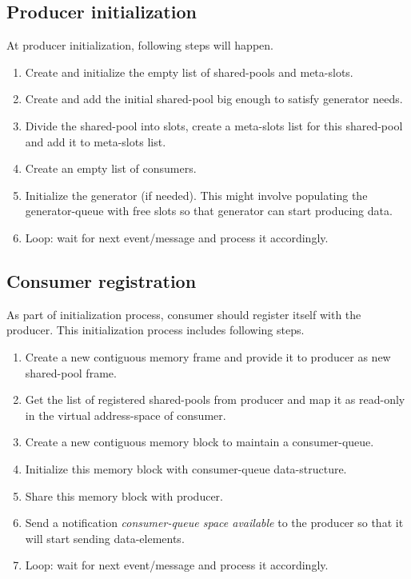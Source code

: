 \documentclass[a4paper,twoside]{report} %
\begin{document}
\subsection{Producer initialization}
At producer initialization, following steps will happen.
\begin{enumerate} 
  \item Create and initialize the empty list of shared-pools and meta-slots.
  \item Create and add the initial shared-pool big enough to satisfy 
  generator needs.  
  \item Divide the shared-pool into slots, create a meta-slots list
  for this shared-pool and add it to meta-slots list.
  \item Create an empty list of consumers.
  \item Initialize the generator (if needed).  This might involve
  populating the generator-queue with free slots so that generator can
  start producing data.
  \item Loop: wait for next event/message and process it accordingly.
\end{enumerate} 



\subsection{Consumer registration}
As part of initialization process, consumer should register itself
with the producer.  This initialization process includes following 
steps.
\begin{enumerate}
  \item Create a new contiguous memory frame and provide it to
  producer as new shared-pool frame.
  \item Get the list of registered shared-pools from producer and 
  map it as read-only in the virtual address-space of consumer.
  \item Create a new contiguous memory block to maintain a 
  consumer-queue.
  \item Initialize this memory block with consumer-queue
  data-structure. 
  \item Share this memory block with producer.
  \item Send a notification \textit{consumer-queue space available} to
  the producer so that it will start sending data-elements.
  \item Loop: wait for next event/message and process it accordingly.
\end{enumerate} 
\end{document}
